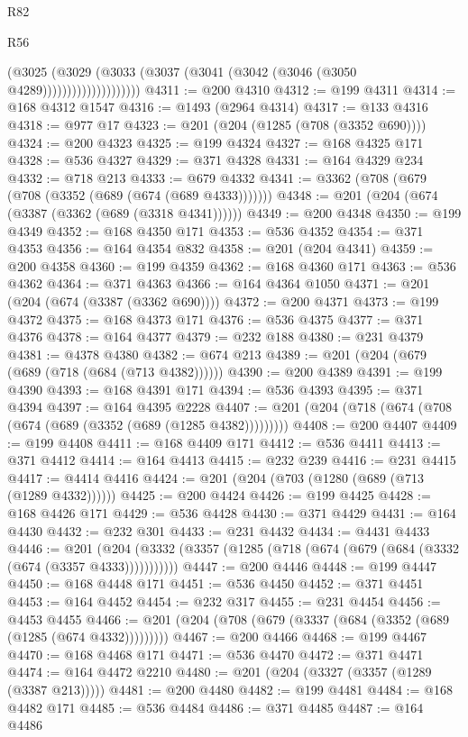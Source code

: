 \begin{lexlean}{R82}
\begin{lexlean}{R56}
\begin{coremodule}
{{{{{{{{{{{{{{{{{{{{{{{{{{{{{{{{{{{{{{{{{{{{{{{{{{{{{{{{{{{{{{{{{{{{{{{{{{{{{{{{{{{{{{{{{{{{{{{{{{{{{{{{{{{{{{{{{{{{{{{{{{{{{{{{{{{{{{{{{{{{{{{{{{{{{{{{{{{{{{{{{{{{{{{{{{{{{{{{{{{{{{{{{{{{{{{{{{{{{{{{{{{{{{{{{{{                            (@3025
                              (@3029
                                (@3033 (@3037 (@3041 (@3042 (@3046 (@3050 @4289))))))))))))))))))))
@4311 := @200 @4310
@4312 := @199 @4311
@4314 := @168 @4312 @1547
@4316 := @1493 (@2964 @4314)
@4317 := @133 @4316
@4318 := @977 @17
@4323 := @201 (@204 (@1285 (@708 (@3352 @690))))
@4324 := @200 @4323
@4325 := @199 @4324
@4327 := @168 @4325 @171
@4328 := @536 @4327
@4329 := @371 @4328
@4331 := @164 @4329 @234
@4332 := @718 @213
@4333 := @679 @4332
@4341 := @3362 (@708 (@679 (@708 (@3352 (@689 (@674 (@689 @4333)))))))
@4348 := @201 (@204 (@674 (@3387 (@3362 (@689 (@3318 @4341))))))
@4349 := @200 @4348
@4350 := @199 @4349
@4352 := @168 @4350 @171
@4353 := @536 @4352
@4354 := @371 @4353
@4356 := @164 @4354 @832
@4358 := @201 (@204 @4341)
@4359 := @200 @4358
@4360 := @199 @4359
@4362 := @168 @4360 @171
@4363 := @536 @4362
@4364 := @371 @4363
@4366 := @164 @4364 @1050
@4371 := @201 (@204 (@674 (@3387 (@3362 @690))))
@4372 := @200 @4371
@4373 := @199 @4372
@4375 := @168 @4373 @171
@4376 := @536 @4375
@4377 := @371 @4376
@4378 := @164 @4377
@4379 := @232 @188
@4380 := @231 @4379
@4381 := @4378 @4380
@4382 := @674 @213
@4389 := @201 (@204 (@679 (@689 (@718 (@684 (@713 @4382))))))
@4390 := @200 @4389
@4391 := @199 @4390
@4393 := @168 @4391 @171
@4394 := @536 @4393
@4395 := @371 @4394
@4397 := @164 @4395 @2228
@4407 := @201 (@204 (@718 (@674 (@708 (@674 (@689 (@3352 (@689 (@1285 @4382)))))))))
@4408 := @200 @4407
@4409 := @199 @4408
@4411 := @168 @4409 @171
@4412 := @536 @4411
@4413 := @371 @4412
@4414 := @164 @4413
@4415 := @232 @239
@4416 := @231 @4415
@4417 := @4414 @4416
@4424 := @201 (@204 (@703 (@1280 (@689 (@713 (@1289 @4332))))))
@4425 := @200 @4424
@4426 := @199 @4425
@4428 := @168 @4426 @171
@4429 := @536 @4428
@4430 := @371 @4429
@4431 := @164 @4430
@4432 := @232 @301
@4433 := @231 @4432
@4434 := @4431 @4433
@4446 := @201
    (@204 (@3332 (@3357 (@1285 (@718 (@674 (@679 (@684 (@3332 (@674 (@3357 @4333)))))))))))
@4447 := @200 @4446
@4448 := @199 @4447
@4450 := @168 @4448 @171
@4451 := @536 @4450
@4452 := @371 @4451
@4453 := @164 @4452
@4454 := @232 @317
@4455 := @231 @4454
@4456 := @4453 @4455
@4466 := @201 (@204 (@708 (@679 (@3337 (@684 (@3352 (@689 (@1285 (@674 @4332)))))))))
@4467 := @200 @4466
@4468 := @199 @4467
@4470 := @168 @4468 @171
@4471 := @536 @4470
@4472 := @371 @4471
@4474 := @164 @4472 @2210
@4480 := @201 (@204 (@3327 (@3357 (@1289 (@3387 @213)))))
@4481 := @200 @4480
@4482 := @199 @4481
@4484 := @168 @4482 @171
@4485 := @536 @4484
@4486 := @371 @4485
@4487 := @164 @4486
}}}}}}}}}}}}}}}}}}}}}}}}}}}}}}}}}}}}}}}}}}}}}}}}}}}}}}}}}}}}}}}}}}}}}}}}}}}}}}}}}}}}}}}}}}}}}}}}}}}}}}}}}}}}}}}}}}}}}}}}}}}}}}}}}}}}}}}}}}}}}}}}}}}}}}}}}}}}}}}}}}}}}}}}}}}}}}}}}}}}}}}}}}}}}}}}}}}}}}}}}}}}}}}}}}}
\end{coremodule}
\end{lexlean}
\end{lexlean}
